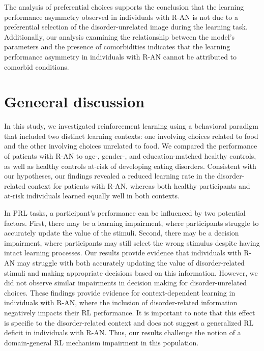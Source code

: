 \documentclass[
  man,floatsintext]{apa6}
\begin{document}
The analysis of preferential choices supports the conclusion that the learning performance asymmetry observed in individuals with R-AN is not due to a preferential selection of the disorder-unrelated image during the learning task. Additionally, our analysis examining the relationship between the model's parameters and the presence of comorbidities indicates that the learning performance asymmetry in individuals with R-AN cannot be attributed to comorbid conditions.

\hypertarget{geneeral-discussion}{%
\section{Geneeral discussion}\label{geneeral-discussion}}

In this study, we investigated reinforcement learning using a behavioral paradigm that included two distinct learning contexts: one involving choices related to food and the other involving choices unrelated to food. We compared the performance of patients with R-AN to age-, gender-, and education-matched healthy controls, as well as healthy controls at-risk of developing eating disorders. Consistent with our hypotheses, our findings revealed a reduced learning rate in the disorder-related context for patients with R-AN, whereas both healthy participants and at-risk individuals learned equally well in both contexts.

In PRL tasks, a participant's performance can be influenced by two potential factors. First, there may be a learning impairment, where participants struggle to accurately update the value of the stimuli. Second, there may be a decision impairment, where participants may still select the wrong stimulus despite having intact learning processes. Our results provide evidence that individuals with R-AN may struggle with both accurately updating the value of disorder-related stimuli and making appropriate decisions based on this information. However, we did not observe similar impairments in decision making for disorder-unrelated choices. These findings provide evidence for context-dependent learning in individuals with R-AN, where the inclusion of disorder-related information negatively impacts their RL performance. It is important to note that this effect is specific to the disorder-related context and does not suggest a generalized RL deficit in individuals with R-AN. Thus, our results challenge the notion of a domain-general RL mechanism impairment in this population.
\end{document}
